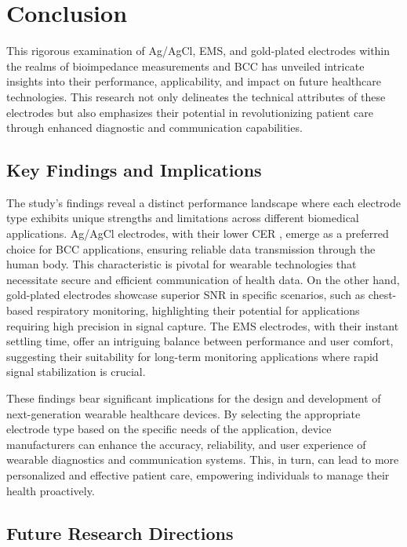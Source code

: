 \documentclass[conference]{IEEEtran}
\begin{document}
\section{Conclusion}

This rigorous examination of Ag/AgCl, EMS, and gold-plated electrodes within the realms of bioimpedance measurements and \gls{BCC} has unveiled intricate insights into their performance, applicability, and impact on future healthcare technologies. This research not only delineates the technical attributes of these electrodes but also emphasizes their potential in revolutionizing patient care through enhanced diagnostic and communication capabilities.

\subsection{Key Findings and Implications}

The study's findings reveal a distinct performance landscape where each electrode type exhibits unique strengths and limitations across different biomedical applications. Ag/AgCl electrodes, with their lower \gls{CER} , emerge as a preferred choice for \gls{BCC} applications, ensuring reliable data transmission through the human body. This characteristic is pivotal for wearable technologies that necessitate secure and efficient communication of health data. On the other hand, gold-plated electrodes showcase superior \gls{SNR} in specific scenarios, such as chest-based respiratory monitoring, highlighting their potential for applications requiring high precision in signal capture. The EMS electrodes, with their instant settling time, offer an intriguing balance between performance and user comfort, suggesting their suitability for long-term monitoring applications where rapid signal stabilization is crucial.

These findings bear significant implications for the design and development of next-generation wearable healthcare devices. By selecting the appropriate electrode type based on the specific needs of the application, device manufacturers can enhance the accuracy, reliability, and user experience of wearable diagnostics and communication systems. This, in turn, can lead to more personalized and effective patient care, empowering individuals to manage their health proactively.

\subsection{Future Research Directions}
\end{document}
